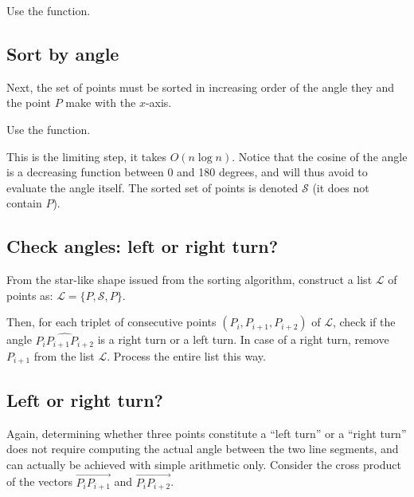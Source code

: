 \begin{pcomment}
\begin{premark}
Use the  function.
\end{premark}
\end{pcomment}

\subsection{Sort by angle}
Next, the set of points must be sorted in increasing order of the angle they and the point $P$ make with the $x$-axis. 


\begin{pcomment}
\begin{premark}
Use the   function.
\end{premark}
\end{pcomment}

This is the limiting step, it takes $O(n \log n)$. Notice that the cosine of the angle is a decreasing function between 0 and 180 degrees, and will thus avoid to evaluate the angle itself. The sorted set of points is denoted $\mathcal{S}$ (it does not contain $P$).


\subsection{Check angles: left or right turn?}

From the star-like shape issued from the sorting algorithm, construct a list $\mathcal{L}$ of points as: $\mathcal{L}=\{ P, \mathcal{S}, P\}$.

Then, for each triplet of consecutive points $(P_i, P_{i+1}, P_{i+2})$ of $\mathcal{L}$, check if the angle $\widehat{P_i P_{i+1}P_{i+2}}$ is a right turn or a left turn. In case of a right turn, remove $P_{i+1}$ from the list $\mathcal{L}$. Process the entire list this way.



\subsection{Left or right turn?}
Again, determining whether three points constitute a ``left turn'' or a ``right turn'' does not require computing the actual angle between the two line segments, and can actually be achieved with simple arithmetic only. Consider  the cross product of the vectors $\overrightarrow{ P_i P_{i+1}}$ and $\overrightarrow{P_iP_{i+2}}$.

